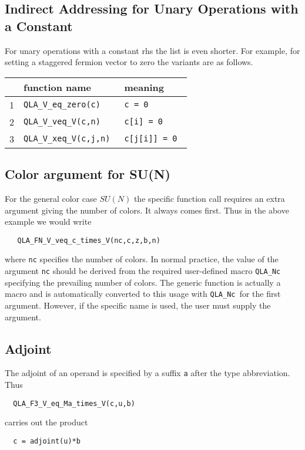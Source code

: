 \documentclass{article}
\newcommand{\ttdash}{{\tt \_}}
\newcommand{\qlaNcMacro}{{\tt QLA}\ttdash{\tt Nc }}
\begin{document}
\subsection{Indirect Addressing for Unary Operations with a Constant}

For unary operations with a constant rhs the list is even shorter.
For example, for setting a staggered fermion vector to zero the
variants are as follows.

\begin{center}
\begin{tabular}{|r|l|l|}
\hline
 & function name & meaning \\
\hline
1  & {\tt QLA\_V\_eq\_zero(c)              } & {\tt c = 0                         } \\
2  & {\tt QLA\_V\_veq\_V(c,n)           } & {\tt c[i] = 0                } \\
3  & {\tt QLA\_V\_xeq\_V(c,j,n)         } & {\tt c[j[i]] = 0       } \\
\hline
\end{tabular}
\end{center}

\subsection{Color argument for SU(N)}

For the general color case $SU(N)$ the specific function call requires
an extra argument giving the number of colors.  It always comes first.
Thus in the above example we would write
%
\begin{verbatim}
   QLA_FN_V_veq_c_times_V(nc,c,z,b,n)
\end{verbatim}
%
where {\tt nc} specifies the number of colors.  In normal practice,
the value of the argument {\tt nc} should be derived from the required
user-defined macro \qlaNcMacro specifying the prevailing number of
colors.  The generic function is actually a macro and is automatically
converted to this usage with \qlaNcMacro for the first argument.
However, if the specific name is used, the user must supply the
argument.

\subsection{Adjoint}

The adjoint of an operand is specified by a suffix {\tt a} after the
type abbreviation.  Thus
%
\begin{verbatim}
  QLA_F3_V_eq_Ma_times_V(c,u,b)
\end{verbatim}
%
carries out the product
%
\begin{verbatim}
  c = adjoint(u)*b
\end{verbatim}
\end{document}
